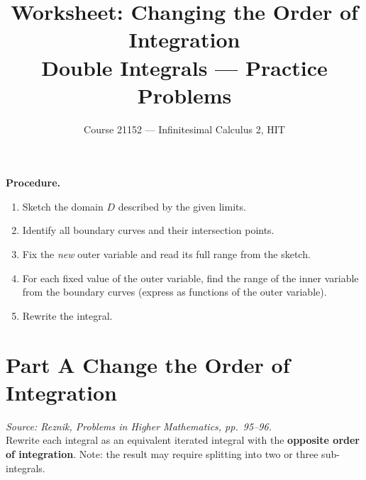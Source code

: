 \documentclass[12pt]{article}
\title{\textbf{Worksheet: Changing the Order of Integration}\\[4pt]
\large Double Integrals --- Practice Problems}
\author{Course 21152 --- Infinitesimal Calculus 2, HIT}
\date{}
\begin{document}
\maketitle
\thispagestyle{fancy}

\begin{mdframed}
\textbf{Procedure.}
\begin{enumerate}[nosep]
  \item Sketch the domain $D$ described by the given limits.
  \item Identify all boundary curves and their intersection points.
  \item Fix the \emph{new} outer variable and read its full range from the sketch.
  \item For each fixed value of the outer variable, find the range of the inner variable from the boundary curves (express as functions of the outer variable).
  \item Rewrite the integral.
\end{enumerate}
\end{mdframed}

\bigskip

\section*{Part A \quad Change the Order of Integration}
\textit{Source: Reznik, \emph{Problems in Higher Mathematics}, pp.\ 95--96.}\\[4pt]
Rewrite each integral as an equivalent iterated integral with the \textbf{opposite order of integration}.
Note: the result may require splitting into two or three sub-integrals.
\end{document}
